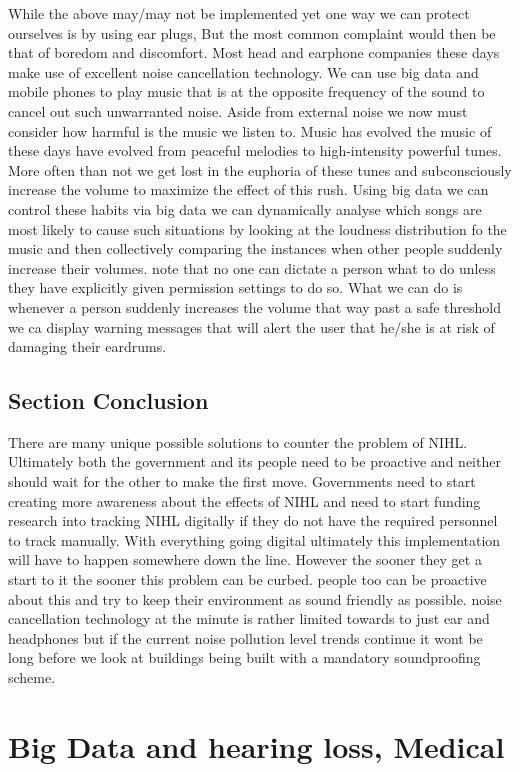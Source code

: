 \documentclass[sigconf]{acmart}
\begin{document}
While the above may/may not be implemented yet one way we can protect ourselves is by using ear plugs, But the most common complaint would then be that of boredom and discomfort. Most head and earphone companies these days make use of excellent noise cancellation technology. We can use big data and mobile phones to play music that is at the opposite frequency of the sound to cancel out such unwarranted noise. Aside from external noise we now must consider how harmful is the music we listen to. Music has evolved the music of these days have evolved from peaceful melodies to high-intensity powerful tunes. More often than not we get lost in the euphoria of these tunes and subconsciously increase the volume to maximize the effect of this rush. Using big data we can control these habits via big data we can dynamically analyse which songs are most likely to cause such situations by looking at the loudness distribution fo the music and then collectively comparing the instances when other people suddenly increase their volumes. note that no one can dictate a person what to do unless they have explicitly given permission settings to do so. What we can do is whenever a person suddenly increases the volume that way past a safe threshold we ca display warning messages that will alert the user that he/she is at risk of damaging their eardrums.

\subsection{Section Conclusion}
There are many unique possible solutions to counter the problem of NIHL. Ultimately both the government and its people need to be proactive and neither should wait for the other to make the first move. Governments need to start creating more awareness about the effects of NIHL and need to start funding research into tracking NIHL digitally if they do not have the required personnel to track manually. With everything going digital ultimately this implementation will have to happen somewhere down the line. However the sooner they get a start to it the sooner this problem can be curbed. people too can be proactive about this and try to keep their environment as sound friendly as possible. noise cancellation technology at the minute is rather limited towards to just ear and headphones but if the current noise pollution level trends continue it wont be long before we look at buildings being built with a mandatory soundproofing scheme.

\section{Big Data and hearing loss, Medical}
\end{document}
